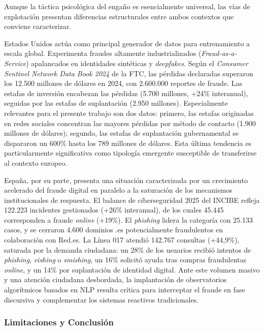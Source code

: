 Aunque la táctica psicológica del engaño es esencialmente universal, las vías de explotación presentan diferencias estructurales entre ambos contextos que conviene caracterizar.

Estados Unidos actúa como principal generador de datos para entrenamiento a escala global. Experimenta fraudes altamente industrializados (\textit{Fraud-as-a-Service}) apalancados en identidades sintéticas y \textit{deepfakes}. Según el \textit{Consumer Sentinel Network Data Book 2024} de la FTC, las pérdidas declaradas superaron los 12.500 millones de dólares en 2024, con 2.600.000 reportes de fraude. Las estafas de inversión encabezan las pérdidas (5.700 millones, +24\% interanual), seguidas por las estafas de suplantación (2.950 millones). Especialmente relevantes para el presente trabajo son dos datos: primero, las estafas originadas en redes sociales concentran las mayores pérdidas por método de contacto (1.900 millones de dólares); segundo, las estafas de suplantación gubernamental se dispararon un 600\% hasta los 789 millones de dólares. Esta última tendencia es particularmente significativa como tipología emergente susceptible de transferirse al contexto europeo.

España, por su parte, presenta una situación caracterizada por un crecimiento acelerado del fraude digital en paralelo a la saturación de los mecanismos institucionales de respuesta. El balance de ciberseguridad 2025 del INCIBE refleja 122.223 incidentes gestionados (+26\% interanual), de los cuales 45.445 corresponden a fraude \textit{online} (+19\%). El \textit{phishing} lidera la categoría con 25.133 casos, y se cerraron 4.600 dominios .es potencialmente fraudulentos en colaboración con Red.es. La Línea 017 atendió 142.767 consultas (+44,9\%), saturada por la demanda ciudadana: un 28\% de los usuarios recibió intentos de \textit{phishing}, \textit{vishing} o \textit{smishing}, un 16\% solicitó ayuda tras compras fraudulentas \textit{online}, y un 14\% por suplantación de identidad digital. Ante este volumen masivo y una atención ciudadana desbordada, la implantación de observatorios algorítmicos basados en NLP resulta crítica para interceptar el fraude en fase discursiva y complementar los sistemas reactivos tradicionales.

\subsubsection{Limitaciones y Conclusión}

